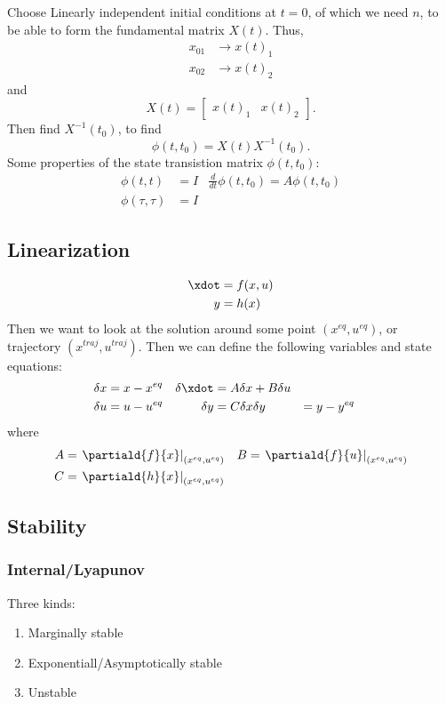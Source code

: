 \documentclass[10pt]{article}
\begin{document}
Choose Linearly independent initial conditions at $t =0$, of which we
need $n$, to be able to form the fundamental matrix $X(t)$.
Thus,
\begin{align*}
  x_{01} &\rightarrow x(t)_1\\
  x_{02} &\rightarrow x(t)_2
\end{align*}
and 
\begin{equation*}
  X(t) =
  \begin{bmatrix}
    x(t)_1 & x(t)_2
  \end{bmatrix}.
\end{equation*}
Then find $X^{-1}(t_0)$, to find
\begin{equation*}
  \phi(t,t_0) = X(t) X^{-1}(t_0).
\end{equation*}
Some properties of the state transistion matrix $\phi(t,t_0)$:
\begin{align*}
  \phi(t,t) &= I & \frac{d}{dt}\phi(t,t_0) = A\phi(t,t_0)\\
  \phi(\tau,\tau) &= I 
\end{align*}

\subsection{Linearization}
\begin{align*}
  \xdot &= f(x,u) \\
  y &= h(x)
\end{align*}
Then we want to look at the solution around some point
$(x^{eq},u^{eq})$, or trajectory $(x^{traj},u^{traj})$.
Then we can define the following variables and state equations:
\begin{align*}
  \delta x &= x - x^{eq}&   \delta\xdot &= A\delta x + B \delta u\\
  \delta u &= u - u^{eq}&   \delta y &= C\delta x
  \delta y &= y - y^{eq}&
\end{align*}
where
\begin{align*}
  A &= \left.\partiald{f}{x}\right|_{(x^{eq},u^{eq})}&
  B &= \left.\partiald{f}{u}\right|_{(x^{eq},u^{eq})}\\
  C &= \left.\partiald{h}{x}\right|_{(x^{eq},u^{eq})}
\end{align*}

\subsection{Stability}

\subsubsection{Internal/Lyapunov}
Three kinds:
\begin{enumerate}
\item Marginally stable
\item Exponentiall/Asymptotically stable
\item Unstable
\end{enumerate}
\end{document}
